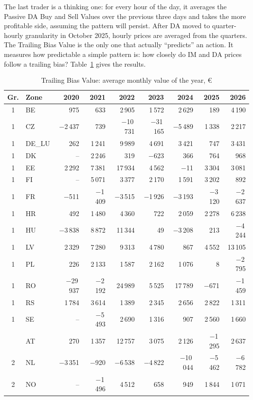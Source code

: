 \documentclass[11pt,a4paper]{article}
\begin{document}
The last trader is a thinking one: for every hour of the day, it averages the Passive DA Buy and Sell Values over the previous three days and takes the more profitable side, assuming the pattern will persist. After DA moved to quarter-hourly granularity in October 2025, hourly prices are averaged from the quarters. The Trailing Bias Value is the only one that actually ``predicts'' an action. It measures how predictable a simple pattern is: how closely do IM and DA prices follow a trailing bias? Table~\ref{tab:trailing_bias} gives the results.

\begin{table}[htbp]
\centering
\small
\setlength{\tabcolsep}{4pt}
\begin{tabular}{@{}c l rrrrrrr@{}}
\toprule
Gr. & Zone & 2020 & 2021 & 2022 & 2023 & 2024 & 2025 & 2026 \\
\midrule
1 & BE & 975 & 633 & 2\,905 & 1\,572 & 2\,629 & 189 & 4\,190 \\
1 & CZ & $-$2\,437 & 739 & $-$10\,731 & $-$31\,165 & $-$5\,489 & 1\,338 & 2\,217 \\
1 & DE\_LU & 262 & 1\,241 & 9\,989 & 4\,691 & 3\,421 & 747 & 3\,431 \\
1 & DK & -- & 2\,246 & 319 & $-$623 & 366 & 764 & 968 \\
1 & EE & 2\,292 & 7\,381 & 17\,934 & 4\,562 & $-$11 & 3\,304 & 3\,081 \\
1 & FI & -- & 5\,071 & 3\,377 & 2\,170 & 1\,591 & 3\,202 & 892 \\
1 & FR & $-$511 & $-$1\,409 & $-$3\,515 & $-$1\,926 & $-$3\,193 & $-$3\,120 & $-$2\,637 \\
1 & HR & 492 & 1\,480 & 4\,360 & 722 & 2\,059 & 2\,278 & 6\,238 \\
1 & HU & $-$3\,838 & 8\,872 & 11\,344 & 49 & $-$3\,208 & 213 & $-$4\,244 \\
1 & LV & 2\,329 & 7\,280 & 9\,313 & 4\,780 & 867 & 4\,552 & 13\,105 \\
1 & PL & 226 & 2\,133 & 1\,587 & 2\,162 & 1\,076 & 8 & $-$2\,795 \\
1 & RO & $-$29\,937 & $-$2\,192 & 24\,989 & 5\,525 & 17\,789 & $-$671 & $-$1\,459 \\
1 & RS & 1\,784 & 3\,614 & 1\,389 & 2\,345 & 2\,656 & 2\,822 & 1\,311 \\
1 & SE & -- & $-$5\,493 & 2\,690 & 1\,316 & 907 & 2\,560 & 1\,660 \\
\addlinespace
2 & AT & 270 & 1\,357 & 12\,757 & 3\,075 & 2\,126 & $-$1\,295 & 2\,637 \\
2 & NL & $-$3\,351 & $-$920 & $-$6\,538 & $-$4\,822 & $-$10\,044 & $-$5\,462 & $-$6\,782 \\
2 & NO & -- & $-$1\,496 & 4\,512 & 658 & 949 & 1\,844 & 1\,071 \\
\bottomrule
\end{tabular}
\caption{Trailing Bias Value: average monthly value of the year, \euro}
\label{tab:trailing_bias}
\end{table}
\end{document}
